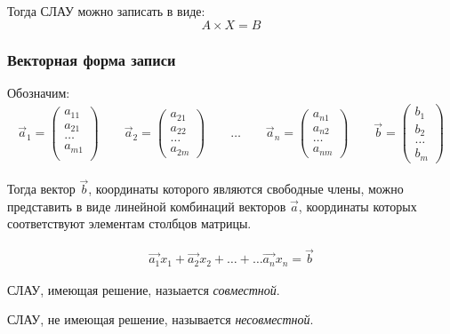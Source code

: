 Тогда СЛАУ можно записать в виде: \[
  \boxed{A \times X = B}
\] 

\subsubsection*{Векторная форма записи}

Обозначим:
\begin{gather*}
  \vec{a}_1 = \left( 
    \begin{matrix}
      a_{11} \\
      a_{21} \\
      \ldots \\
      a_{m1} \\
    \end{matrix}
  \right) \qquad
  \vec{a}_2 = \left( 
    \begin{matrix}
      a_{21} \\
      a_{22} \\
      \ldots \\
      a_{2m}
    \end{matrix}
  \right) \qquad \ldots \qquad 
  \vec{a}_n = \left( 
    \begin{matrix}
      a_{n1} \\
      a_{n2} \\
      \ldots \\
      a_{nm}
    \end{matrix}
  \right) \qquad 
  \vec{b} = \left( 
    \begin{matrix}
      b_1 \\ 
      b_2 \\
      \ldots \\
      b_m
    \end{matrix}
  \right)
\end{gather*}

Тогда вектор $\vec{b}$, координаты которого являются свободные члены, можно представить в виде линейной комбинаций векторов $\vec{a}$, координаты которых соответствуют элементам столбцов матрицы.

\begin{gather*}
  \vec{a_1} x_1 + \vec{a_2} x_2 + \ldots + \ldots \vec{a_n} x_{n} = \vec{b}
\end{gather*}

\begin{definition}
  СЛАУ, имеющая решение, назыается \textit{совместной}.
\end{definition}

\begin{definition}
  СЛАУ, не имеющая решение, называется \textit{несовместной}.  
\end{definition}

